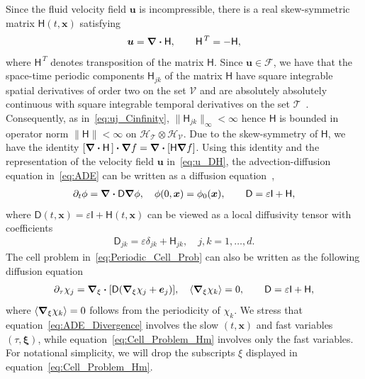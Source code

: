\documentclass[leqno,onefignum,onetabnum]{siamltex1213}
\newcommand{\Tc}{\mathcal{T}}
\newcommand{\Vc}{\mathcal{V}}
\newcommand{\Hc}{\mathcal{H}}
\newcommand{\Fc}{\mathcal{F}}
\newcommand{\Dm}{\mathsf{D}}
\newcommand{\Hm}{\mathsf{H}}
\newcommand{\Ib}{\mathsf{I}}
\newcommand\bnabla{\mbox{\boldmath${\nabla}$}}
\providecommand\bcdot{\boldsymbol{\cdot}}
\newcommand{\vecx}{\boldsymbol{x}}
\newcommand{\vecu}{\boldsymbol{u}}
\newcommand{\vece}{\boldsymbol{e}}
\newcommand{\vecxi}{\boldsymbol{\xi}}
\begin{document}
Since the fluid velocity field $\vecu$ is incompressible, there is a
real skew-symmetric matrix $\Hm(t,\vecx)$
satisfying~\cite{Avellaneda:PRL-753,Avellaneda:CMP-339}   
% 
\begin{align}\label{eq:u_DH}
 \vecu =\bnabla \bcdot\Hm, \qquad   \Hm^{\,T}=-\Hm,
\end{align}
% 
where $\Hm^{\,T}$ denotes transposition of the matrix $\Hm$. Since
$\vecu\in\Fc$, we have that the space-time periodic components
$\Hm_{jk}$ of the matrix $\Hm$ have square integrable spatial
derivatives of order two on the set $\Vc$ and are absolutely
absolutely continuous with square integrable temporal derivatives on
the set $\Tc$~\cite{Bhattacharya:AAP:1999:951}. Consequently, as
in~\eqref{eq:uj_Cinfinity}, $\|\Hm_{jk}\|_\infty<\infty$ hence $\Hm$ is bounded in
operator norm $\|\Hm\|<\infty$ on $\Hc_{\Tc}\otimes\Hc_{\Vc}$. Due to  
the skew-symmetry of $\Hm$, we have the identity
$[\bnabla\bcdot\Hm\,]\bcdot\bnabla f=\bnabla\bcdot[\Hm\bnabla f]$. Using
this identity and the representation of the velocity field $\vecu$
in~\eqref{eq:u_DH}, the advection-diffusion equation in~\eqref{eq:ADE}
can be written as a diffusion
equation~\cite{Fannjiang:1994:SIAM_JAM:333},    
%
\begin{align}\label{eq:ADE_Divergence}
  \partial_t\phi%
    =\bnabla \bcdot\Dm\bnabla \phi, \quad
    \phi(0,\vecx)=\phi_0(\vecx),
    \qquad
    \Dm=\varepsilon\Ib+\Hm,
\end{align}
%
where $\Dm(t,\vecx)=\varepsilon\Ib+\Hm(t,\vecx)$ can be viewed as a local
diffusivity tensor with coefficients
%
\begin{align}\label{eq:kappa_coeff}
  \Dm_{jk}=\varepsilon\delta_{jk}+\Hm_{jk},\quad j,k=1,\ldots,d.
\end{align}
%
The cell problem in~\eqref{eq:Periodic_Cell_Prob} can also be
written as the following diffusion
equation~\cite{Fannjiang:1994:SIAM_JAM:333}     
% 
\begin{align}\label{eq:Cell_Problem_Hm}
  \partial_\tau\chi_j=\bnabla_\xi \bcdot[\Dm(\bnabla_\xi \chi_j+\vece_j)],
  \quad
  \langle\bnabla_\xi \chi_k\rangle=0, \qquad
  \Dm=\varepsilon\Ib+\Hm,
\end{align}
%
where $\langle\bnabla_\xi \chi_k\rangle=0$ follows from the periodicity of $\chi_k$. We
stress that equation~\eqref{eq:ADE_Divergence} involves the slow
$(t,\vecx)$ and fast variables $(\tau,\vecxi)$, while
equation~\eqref{eq:Cell_Problem_Hm} involves only the fast variables. 
For notational simplicity, we will drop the subscripts $\xi$ displayed
in equation~\eqref{eq:Cell_Problem_Hm}. 
\end{document}
